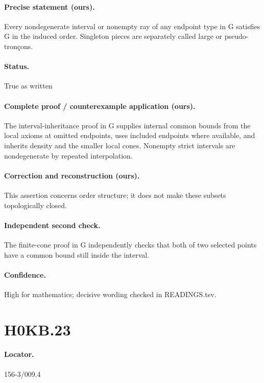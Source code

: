 \paragraph{Precise statement (ours).} Every nondegenerate interval or nonempty ray of any endpoint type in G satisfies G in the induced order. Singleton pieces are separately called large or pseudo-tronçons.

\paragraph{Status.} True as written

\paragraph{Complete proof / counterexample application (ours).} The interval-inheritance proof in G supplies internal common bounds from the local axioms at omitted endpoints, uses included endpoints where available, and inherits density and the smaller local cones. Nonempty strict intervals are nondegenerate by repeated interpolation.

\paragraph{Correction and reconstruction (ours).} This assertion concerns order structure; it does not make these subsets topologically closed.

\paragraph{Independent second check.} The finite-cone proof in G independently checks that both of two selected points have a common bound still inside the interval.

\paragraph{Confidence.} High for mathematics; decisive wording checked in READINGS.tsv.

\section*{H0KB.23}\label{statement:H0KB.23}
\paragraph{Locator.} 156-3/009.4

